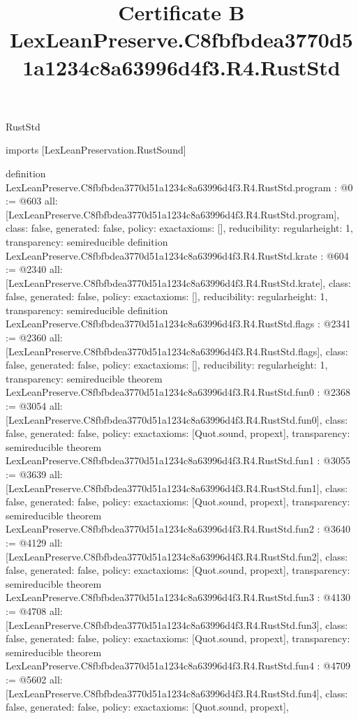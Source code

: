 \begin{lexlean}{RustStd}
\title{Certificate B LexLeanPreserve.C8fbfbdea3770d51a1234c8a63996d4f3.R4.RustStd}
\begin{coremodule}
imports [LexLeanPreservation.RustSound]

definition LexLeanPreserve.C8fbfbdea3770d51a1234c8a63996d4f3.R4.RustStd.program : @0 := @603 {
  all: [LexLeanPreserve.C8fbfbdea3770d51a1234c8a63996d4f3.R4.RustStd.program],
  class: false,
  generated: false,
  policy: exact{axioms: []},
  reducibility: regular{height: 1},
  transparency: semireducible
}
definition LexLeanPreserve.C8fbfbdea3770d51a1234c8a63996d4f3.R4.RustStd.krate : @604 := @2340 {
  all: [LexLeanPreserve.C8fbfbdea3770d51a1234c8a63996d4f3.R4.RustStd.krate],
  class: false,
  generated: false,
  policy: exact{axioms: []},
  reducibility: regular{height: 1},
  transparency: semireducible
}
definition LexLeanPreserve.C8fbfbdea3770d51a1234c8a63996d4f3.R4.RustStd.flags : @2341 := @2360 {
  all: [LexLeanPreserve.C8fbfbdea3770d51a1234c8a63996d4f3.R4.RustStd.flags],
  class: false,
  generated: false,
  policy: exact{axioms: []},
  reducibility: regular{height: 1},
  transparency: semireducible
}
theorem LexLeanPreserve.C8fbfbdea3770d51a1234c8a63996d4f3.R4.RustStd.fun0 : @2368 := @3054 {
  all: [LexLeanPreserve.C8fbfbdea3770d51a1234c8a63996d4f3.R4.RustStd.fun0],
  class: false,
  generated: false,
  policy: exact{axioms: [Quot.sound, propext]},
  transparency: semireducible
}
theorem LexLeanPreserve.C8fbfbdea3770d51a1234c8a63996d4f3.R4.RustStd.fun1 : @3055 := @3639 {
  all: [LexLeanPreserve.C8fbfbdea3770d51a1234c8a63996d4f3.R4.RustStd.fun1],
  class: false,
  generated: false,
  policy: exact{axioms: [Quot.sound, propext]},
  transparency: semireducible
}
theorem LexLeanPreserve.C8fbfbdea3770d51a1234c8a63996d4f3.R4.RustStd.fun2 : @3640 := @4129 {
  all: [LexLeanPreserve.C8fbfbdea3770d51a1234c8a63996d4f3.R4.RustStd.fun2],
  class: false,
  generated: false,
  policy: exact{axioms: [Quot.sound, propext]},
  transparency: semireducible
}
theorem LexLeanPreserve.C8fbfbdea3770d51a1234c8a63996d4f3.R4.RustStd.fun3 : @4130 := @4708 {
  all: [LexLeanPreserve.C8fbfbdea3770d51a1234c8a63996d4f3.R4.RustStd.fun3],
  class: false,
  generated: false,
  policy: exact{axioms: [Quot.sound, propext]},
  transparency: semireducible
}
theorem LexLeanPreserve.C8fbfbdea3770d51a1234c8a63996d4f3.R4.RustStd.fun4 : @4709 := @5602 {
  all: [LexLeanPreserve.C8fbfbdea3770d51a1234c8a63996d4f3.R4.RustStd.fun4],
  class: false,
  generated: false,
  policy: exact{axioms: [Quot.sound, propext]},
}
\end{coremodule}
\end{lexlean}
